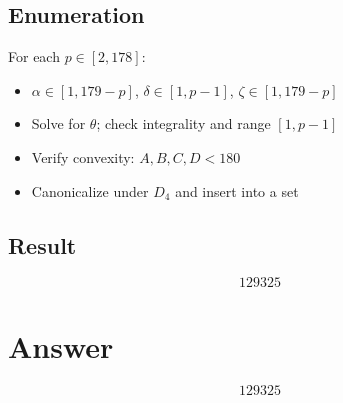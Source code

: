 \documentclass[12pt]{article}
\begin{document}
\subsection{Enumeration}
For each $p \in [2, 178]$:
\begin{itemize}
\item $\alpha \in [1, 179-p]$, $\delta \in [1, p-1]$, $\zeta \in [1, 179-p]$
\item Solve for $\theta$; check integrality and range $[1, p-1]$
\item Verify convexity: $A, B, C, D < 180$
\item Canonicalize under $D_4$ and insert into a set
\end{itemize}

\subsection{Result}
\[
\boxed{129325}
\]

\section{Answer}

\[
\boxed{129325}
\]
\end{document}
